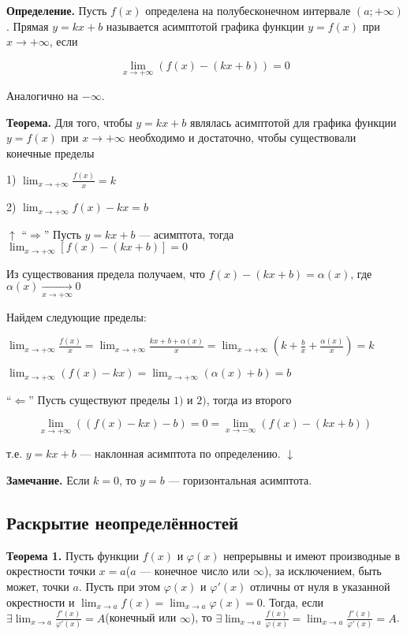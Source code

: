 \documentclass{article}
\begin{document}
    \textbf{Определение.} Пусть \(f(x)\) определена на полубесконечном интервале \((a; +\infty)\). Прямая \(y = kx + b\) называется асимптотой графика функции \(y = f(x)\) при \(x \to +\infty\), если
    
    \[\lim_{x \to +\infty} (f(x) - (kx+b)) = 0\]

    Аналогично на \(-\infty\).

    \textbf{Теорема.} Для того, чтобы \( y = kx + b \) являлась асимптотой для графика функции \( y = f(x) \) при \( x \to +\infty \) необходимо и достаточно, чтобы существовали конечные пределы
    
    1) \( \lim_{x \to +\infty} \frac{f(x)}{x} = k \)

    2) \( \lim_{x \to +\infty} f(x) - kx = b \)

    \( \uparrow \) ``\( \Rightarrow \)'' Пусть \( y = kx + b \) --- асимптота, тогда \( \lim_{x \to +\infty}[f(x) - (kx + b)] = 0 \)

    Из существования предела получаем, что \( f(x) - (kx + b) = \alpha(x) \), где \( \alpha(x) \xrightarrow[x \to +\infty]{} 0 \)

    Найдем следующие пределы:

    \( \lim_{x \to +\infty} \frac{f(x)}{x} = \lim_{x \to +\infty} \frac{kx + b + \alpha(x)}{x} = \lim_{x \to +\infty}(k + \frac{b}{x} + \frac{\alpha(x)}{x}) = k \)

    \( \lim_{x \to +\infty} (f(x) - kx) = \lim_{x \to +\infty} (\alpha(x) + b) = b \)
    
    ``\(\Leftarrow\)'' Пусть существуют пределы \(1)\) и \(2)\), тогда из второго

    \[\lim_{x \to +\infty} ((f(x)-kx)-b) = 0 = \lim_{x \to -\infty} (f(x) - (kx+b))\]

    т.е. \(y = kx + b\) --- наклонная асимптота по определению. \(\downarrow\)

    \textbf{Замечание.} Если \(k=0\), то \(y=b\) --- горизонтальная асимптота.
    
    \subsection{Раскрытие неопределённостей}

    \textbf{Теорема 1.} Пусть функции \(f(x)\) и \(\varphi(x)\) непрерывны и имеют производные в окрестности точки \(x=a\)(\(a\) --- конечное число или \(\infty\)), за исключением, быть может, точки \(a\). Пусть при этом \(\varphi(x)\) и \(\varphi'(x)\) отличны от нуля в указанной окрестности и \(\lim_{x \to a} f(x) = \lim_{x \to a} \varphi(x) = 0\).
    Тогда, если \(\exists \lim_{x \to a} \frac{f'(x)}{\varphi'(x)} = A\)(конечный или \(\infty\)), то \(\exists \lim_{x \to a} \frac{f(x)}{\varphi(x)} = \lim_{x \to a} \frac{f'(x)}{\varphi'(x)} = A\).
\end{document}
